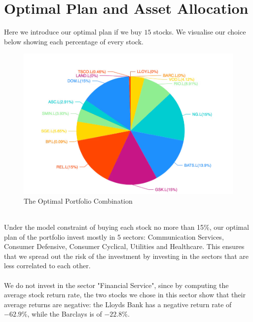 

\section{Optimal Plan and Asset Allocation}

Here we introduce our optimal plan if we buy $15$ stocks. We visualise our choice below showing each percentage of every stock.

\begin{center}
\begin{figure}[htp]
    \includegraphics[width=15cm]{./Figures/optimal.png}
    \caption{The Optimal Portfolio Combination}
    \label{optimal}
\end{figure}
\end{center}

\hspace*{\fill}\\
Under the model constraint of buying each stock no more than 15\%, our optimal plan of the portfolio invest mostly in 5 sectors: Communication Services, Consumer Defensive, Consumer Cyclical, Utilities and Healthcare. This ensures that we spread out the risk of the investment by investing in the sectors that are less correlated to each other.
\\\hspace*{\fill}\\
We do not invest in the sector "Financial Service", since by computing the average stock return rate, the two stocks we chose in this sector show that their average returns are negative: the Lloyds Bank has a negative return rate of $-62.9\%$, while the Barclays is of $-22.8\%$.
\\\hspace*{\fill}\\

